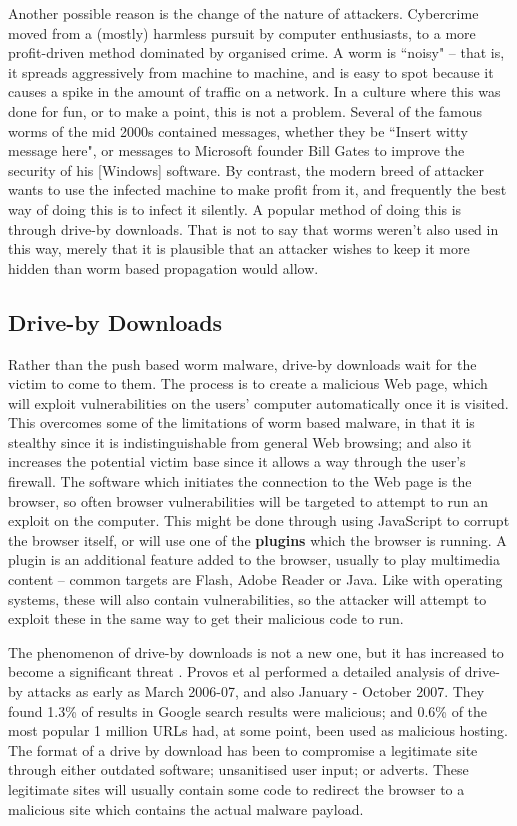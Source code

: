 \documentclass{acm_proc_article-sp}
\begin{document}
Another possible reason is the change of the nature of attackers.  Cybercrime moved from a (mostly) harmless pursuit by computer enthusiasts, to a more profit-driven method dominated by organised crime.  A worm is ``noisy" -- that is, it spreads aggressively from machine to machine, and is easy to spot because it causes a spike in the amount of traffic on a network.  In a culture where this was done for fun, or to make a point, this is not a problem.  Several of the famous worms of the mid 2000s contained messages, whether they be ``Insert witty message here", or messages to Microsoft founder Bill Gates to improve the security of his [Windows] software.  By contrast, the modern breed of attacker wants to use the infected machine to make profit from it, and frequently the best way of doing this is to infect it silently.  A popular method of doing this is through drive-by downloads.  That is not to say that worms weren't also used in this way, merely that it is plausible that an attacker wishes to keep it more hidden than worm based propagation would allow.

\subsection{Drive-by Downloads}
Rather than the push based worm malware, drive-by downloads wait for the victim to come to them.  The process is to create a malicious Web page, which will exploit vulnerabilities on the users' computer automatically once it is visited.  This overcomes some of the limitations of worm based malware, in that it is stealthy since it is indistinguishable from general Web browsing; and also it increases the potential victim base since it allows a way through the user's firewall\cite{provos}.  The software which initiates the connection to the Web page is the browser, so often browser vulnerabilities will be targeted to attempt to run an exploit on the computer.  This might be done through using JavaScript to corrupt the browser itself, or will use one of the \textbf{plugins} which the browser is running.  A plugin is an additional feature added to the browser, usually to play multimedia content -- common targets are Flash, Adobe Reader or Java.  Like with operating systems, these will also contain vulnerabilities, so the attacker will attempt to exploit these in the same way to get their malicious code to run.

The phenomenon of drive-by downloads is not a new one, but it has increased to become a significant threat .  Provos et al performed a detailed analysis of drive-by attacks as early as March 2006-07\cite{provos}, and also January - October 2007\cite{provos2008}.  They found 1.3\% of results in Google search results were malicious; and 0.6\% of the most popular 1 million URLs had, at some point, been used as malicious hosting.  The format of a drive by download has been to compromise a legitimate site through either outdated software; unsanitised user input; or adverts\cite{provos}\cite{provos2008}.  These legitimate sites will usually contain some code to redirect the browser to a malicious site which contains the actual malware payload.
\end{document}
